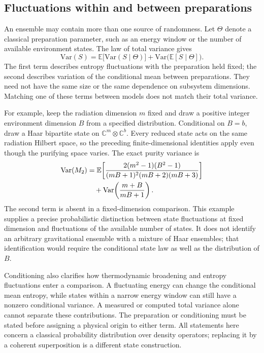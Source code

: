 \documentclass[11pt,letterpaper]{article}
\theoremstyle{plain}
\theoremstyle{definition}
\theoremstyle{remark}
\newcommand{\E}{\mathbb{E}}
\newcommand{\Var}{\text{Var}}
\begin{document}
\subsection{Fluctuations within and between preparations}
\label{subsec12:conditional_variance}

An ensemble may contain more than one source of randomness.  Let
$\Theta$ denote a classical preparation parameter, such as an energy
window or the number of available environment states.  The law of total
variance gives
\begin{equation}
 \Var(S)=\E\bigl[\Var(S\mid\Theta)\bigr]
       +\Var\bigl(\E[S\mid\Theta]\bigr).
 \label{eq12:total_variance}
\end{equation}
The first term describes entropy fluctuations with the preparation held
fixed; the second describes variation of the conditional mean between
preparations.  They need not have the same size or the same dependence
on subsystem dimensions.  Matching one of these terms between models
does not match their total variance.

For example, keep the radiation dimension $m$ fixed and draw a positive
integer environment dimension $B$ from a specified distribution.
Conditional on $B=b$, draw a Haar bipartite state on
$\mathbb C^m\otimes\mathbb C^b$.  Every reduced state acts on the
same radiation Hilbert space, so the preceding finite-dimensional
identities apply even though the purifying space varies.  The exact
purity variance is
\begin{align}
 \Var(M_2)
 &=\E\!\left[
 \frac{2(m^2-1)(B^2-1)}{(mB+1)^2(mB+2)(mB+3)}\right]
 \notag\\
 &\quad+\Var\!\left(\frac{m+B}{mB+1}\right).
 \label{eq12:random_dimension_variance}
\end{align}
The second term is absent in a fixed-dimension comparison.  This
example supplies a precise probabilistic distinction between state
fluctuations at fixed dimension and fluctuations of the available number
of states.  It does not identify an arbitrary gravitational ensemble
with a mixture of Haar ensembles; that identification would require
the conditional state law as well as the distribution of $B$.

Conditioning also clarifies how thermodynamic broadening and entropy
fluctuations enter a comparison.  A fluctuating energy can change the
conditional mean entropy, while states within a narrow energy window
can still have a nonzero conditional variance.  A measured or computed
total variance alone cannot separate these contributions.  The
preparation or conditioning must be stated before assigning a physical
origin to either term.  All statements here concern a classical
probability distribution over density operators; replacing it by a
coherent superposition is a different state construction.
\end{document}
